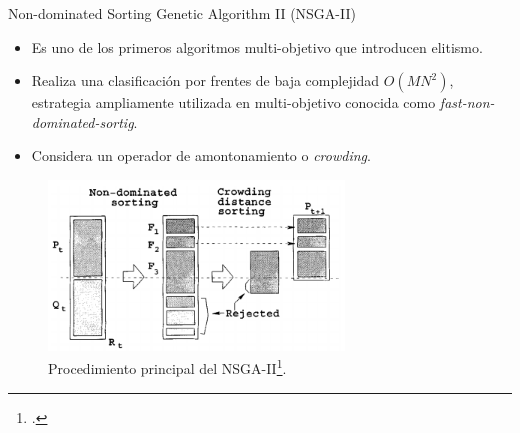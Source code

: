 \documentclass{beamer}
\begin{document}
\begin{frame}{Non-dominated Sorting Genetic Algorithm II (NSGA-II)}
\begin{itemize}
\scriptsize
\item Es uno de los primeros algoritmos multi-objetivo que introducen elitismo.
\item Realiza una clasificación por frentes de baja complejidad $O(MN^2)$, estrategia ampliamente utilizada en multi-objetivo conocida como \textit{fast-non-dominated-sortig}.
\item Considera un operador de amontonamiento o \textit{crowding}. 
\end{itemize}

\begin{figure}[H]
\centering
\includegraphics[width=0.7\textwidth]{crowding_nsgaii.png}
\caption{\scriptsize Procedimiento principal del NSGA-II\footcite{Joel:NSGAII}.}
\end{figure}
\end{frame}
\end{document}

